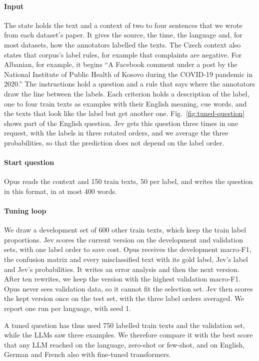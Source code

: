 \documentclass[sigconf]{acmart}
\begin{document}
\paragraph{Input}
The state holds the text and a context of two to four sentences that we wrote from each dataset's paper. It gives the source, the time, the language and, for most datasets, how the annotators labelled the texts. The Czech context also states that corpus's label rules, for example that complaints are negative. For Albanian, for example, it begins ``A Facebook comment under a post by the National Institute of Public Health of Kosovo during the COVID-19 pandemic in 2020.'' The instructions hold a question and a rule that says where the annotators draw the line between the labels. Each criterion holds a description of the label, one to four train texts as examples with their English meaning, cue words, and the texts that look like the label but get another one. Fig.~\ref{fig:tuned-question} shows part of the English question. Jev gets this question three times in one request, with the labels in three rotated orders, and we average the three probabilities, so that the prediction does not depend on the label order.

\paragraph{Start question}
Opus reads the context and 150 train texts, 50 per label, and writes the question in this format, in at most 400 words.

\paragraph{Tuning loop}
We draw a development set of 600 other train texts, which keep the train label proportions. Jev scores the current version on the development and validation sets, with one label order to save cost. Opus receives the development macro-F1, the confusion matrix and every misclassified text with its gold label, Jev's label and Jev's probabilities. It writes an error analysis and then the next version. After ten rewrites, we keep the version with the highest validation macro-F1. Opus never sees validation data, so it cannot fit the selection set. Jev then scores the kept version once on the test set, with the three label orders averaged. We report one run per language, with seed 1.

A tuned question has thus used 750 labelled train texts and the validation set, while the LLMs saw three examples. We therefore compare it with the best score that any LLM reached on the language, zero-shot or few-shot, and on English, German and French also with fine-tuned transformers.
\end{document}
